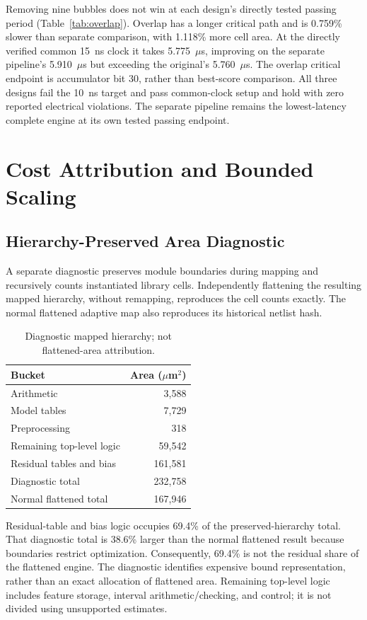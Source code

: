 Removing nine bubbles does not win at each design's directly tested passing
period (Table~\ref{tab:overlap}). Overlap has a longer critical path and is
0.759\% slower than separate comparison, with 1.118\% more cell area. At the
directly verified common 15~ns clock it takes 5.775~$\mu$s, improving on the
separate pipeline's 5.910~$\mu$s but exceeding the original's 5.760~$\mu$s.
The overlap critical endpoint is accumulator bit 30, rather than best-score
comparison. All three designs fail the 10~ns target and pass common-clock setup
and hold with zero reported electrical violations. The separate pipeline
remains the lowest-latency complete engine at its own tested passing endpoint.


\section{Cost Attribution and Bounded Scaling}
\subsection{Hierarchy-Preserved Area Diagnostic}
A separate diagnostic preserves module boundaries during mapping and recursively
counts instantiated library cells. Independently flattening the resulting
mapped hierarchy, without remapping, reproduces the cell counts exactly. The
normal flattened adaptive map also reproduces its historical netlist hash.

\begin{table}[t]
\caption{Diagnostic mapped hierarchy; not flattened-area attribution.}
\centering
\begin{tabular}{lr}
\toprule
Bucket & Area ($\mu$m$^2$) \\
\midrule
Arithmetic & 3,588 \\
Model tables & 7,729 \\
Preprocessing & 318 \\
Remaining top-level logic & 59,542 \\
Residual tables and bias & 161,581 \\
\midrule
Diagnostic total & 232,758 \\
Normal flattened total & 167,946 \\
\bottomrule
\end{tabular}
\end{table}

Residual-table and bias logic occupies 69.4\% of the preserved-hierarchy total.
That diagnostic total is 38.6\% larger than the normal flattened result because
boundaries restrict optimization. Consequently, 69.4\% is not the residual share
of the flattened engine. The diagnostic identifies expensive bound
representation, rather than an exact allocation of flattened area. Remaining
top-level logic includes feature storage, interval arithmetic/checking, and
control; it is not divided using unsupported estimates.

